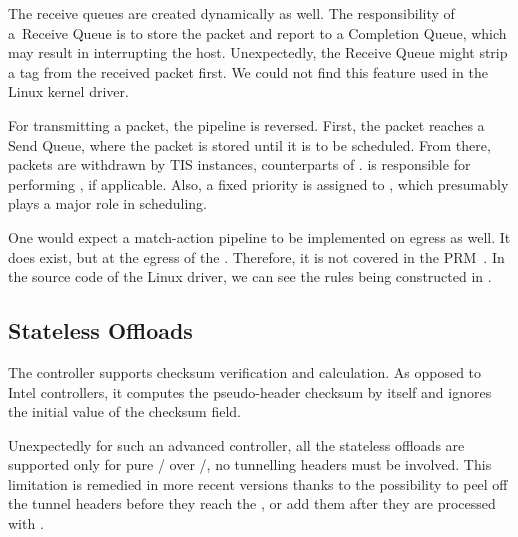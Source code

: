 The receive queues are created dynamically as well. The responsibility of a~Receive
Queue is to store the packet and report to a Completion Queue, which may result
in interrupting the host. Unexpectedly, the Receive Queue might strip
a  tag from the received packet first. We could not find this
feature used in the Linux kernel driver.

For transmitting a packet, the pipeline is reversed. First, the packet reaches
a Send Queue, where the packet is stored until it is to be scheduled. From
there, packets are withdrawn by \acrfull{TIS} instances, counterparts of
.  is responsible for performing , if applicable. Also,
a fixed priority is assigned to , which presumably plays a major role in
scheduling.

One would expect a match-action pipeline to be implemented on egress as well.
It does exist, but at the egress of the . Therefore, it is not
covered in the PRM~\cite{mlx-prm}. In the source code of the Linux driver, we
can see the rules being constructed in
.

\subsection{Stateless Offloads}

The controller supports checksum verification and calculation. As opposed to
Intel controllers, it computes the pseudo-header checksum by itself and ignores
the initial value of the checksum field.

Unexpectedly for such an advanced controller, all the stateless offloads are
supported only for pure / over /, no tunnelling
headers must be involved. This limitation is remedied in more recent versions
thanks to the possibility to peel off the tunnel headers before they reach the
, or add them after they are processed with .

